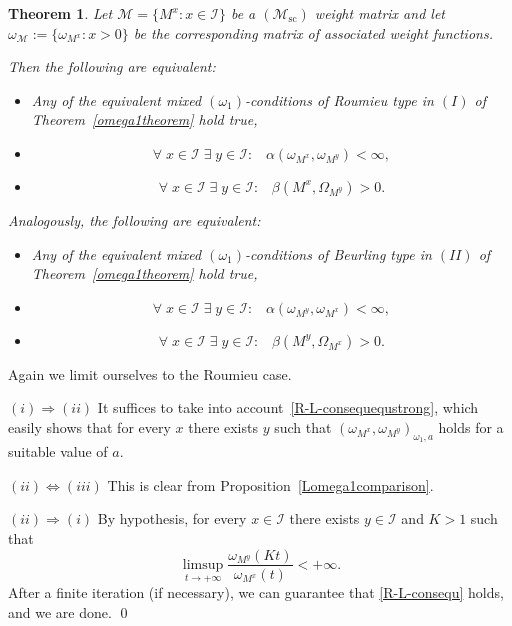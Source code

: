 \documentclass[10pt]{amsart}%
\numberwithin{equation}{section}
\theoremstyle{plain}
\newtheorem{theorem}[proposition]{Theorem}
\let\on=\operatorname
\begin{document}
\begin{theorem}\label{omega1importequivalence}
Let $\mathcal{M}=\{M^x: x\in\mathcal{I}\}$ be a \hyperlink{Msc}{$(\mathcal{M}_{\on{sc}})$} weight matrix and let $\omega_{\mathcal{M}}:=\{\omega_{M^x}: x>0\}$ be the corresponding matrix of associated weight functions.

Then the following are equivalent:
\begin{itemize}
\item[$(i)$] %
Any of the equivalent mixed \hyperlink{om1}{$(\omega_1)$}-conditions of Roumieu type in $(I)$ of Theorem~\ref{omega1theorem} hold true,
\item[$(ii)$]
$$\forall\;x\in\mathcal{I}\;\exists\;y\in\mathcal{I}:\;\;\; \alpha(\omega_{M^x},\omega_{M^y})<\infty,$$

\item[$(iii)$]
$$\forall\;x\in\mathcal{I}\;\exists\;y\in\mathcal{I}:\;\;\; \beta(M^x,\Omega_{M^y})>0.$$
\end{itemize}

Analogously, the following are equivalent:
\begin{itemize}
\item[$(i)$] Any of the equivalent mixed \hyperlink{om1}{$(\omega_1)$}-conditions of Beurling type in $(II)$ of Theorem~\ref{omega1theorem} hold true,
\item[$(ii)$]
$$\forall\;x\in\mathcal{I}\;\exists\;y\in\mathcal{I}:\;\;\; \alpha(\omega_{M^y},\omega_{M^x})<\infty,$$

\item[$(iii)$]
$$\forall\;x\in\mathcal{I}\;\exists\;y\in\mathcal{I}:\;\;\; \beta(M^y,\Omega_{M^x})>0.$$
\end{itemize}
\end{theorem}

Again we limit ourselves to the Roumieu case.

$(i)\Rightarrow(ii)$ It suffices to take into account~\eqref{R-L-consequequstrong}, which easily shows that for every $x$ there exists $y$ such that $(\omega_{M^x},\omega_{M^y})_{\omega_1,a}$ holds for a suitable value of $a$.

$(ii)\Leftrightarrow(iii)$ This is clear from Proposition~\ref{Lomega1comparison}.

$(ii)\Rightarrow(i)$ By hypothesis, for every $x\in\mathcal{I}$ there exists $y\in\mathcal{I}$ and $K>1$ such that
$$
\limsup_{t\rightarrow+\infty}\frac{\omega_{M^y}(Kt)}{\omega_{M^x}(t)}<+\infty.
$$
After a finite iteration (if necessary), we can guarantee that \eqref{R-L-consequ} holds, and we are done.
\qed\enddemo
\end{document}
